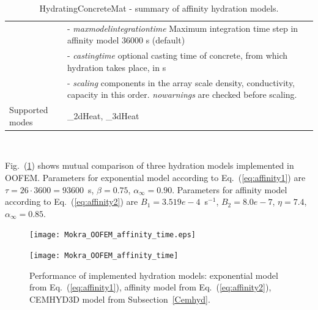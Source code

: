 \documentclass[a4paper]{article}
\newcommand{\param}[1]{{\it #1}}
\newcommand{\refeq}[1]{Eq.~(\ref{#1})}
\newcommand{\reffig}[1]{Fig.~(\ref{#1})}
\newenvironment{mmt}{\begin{tabular}{|l|p{9cm}|}}{\end{tabular}\\}
\newenvironment{mmt}{\begin{tabular}{|l|l|}}{\end{tabular}\\}
\begin{document}
\begin{table}[!htb]
\begin{mmt}
&- \param{maxmodelintegrationtime} Maximum integration time step in affinity model 36000 s (default)\\
&- \param{castingtime} optional casting time of concrete, from which hydration takes place, in s\\
&- \param{scaling} components in the array scale density, conductivity, capacity in this order. \param{nowarnings} are checked before scaling.\\
Supported modes& \_2dHeat, \_3dHeat\\
\hline
\end{mmt}
\caption{HydratingConcreteMat - summary of affinity hydration models.}
\label{Affinity1_table}
\end{table}

\reffig{hydration_comparison} shows mutual comparison of three hydration models implemented in OOFEM. Parameters for exponential model according to \refeq{eq:affinity1} are $\tau=26\cdot3600=93600$~s, $\beta=0.75$, $\alpha_\infty=0.90$. Parameters for affinity model according to \refeq{eq:affinity2} are $B_1=3.519e-4$~s$^{-1}$, $B_2=8.0e-7$, $\eta=7.4$, $\alpha_\infty=0.85$.

\begin{figure}[!htb]
\begin{htmlonly}
  \centerline{\texttt{[image: Mokra\_OOFEM\_affinity\_time.eps]}}
\end{htmlonly}
 \centerline{\texttt{[image: Mokra\_OOFEM\_affinity\_time]}}
  \caption{Performance of implemented hydration models: exponential model from \refeq{eq:affinity1}, affinity model from \refeq{eq:affinity2}, CEMHYD3D model from Subsection~\ref{Cemhyd}.}
  \label{hydration_comparison}
\end{figure}
\end{document}

